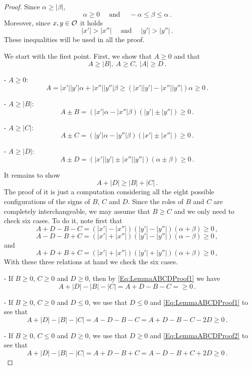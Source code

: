 \begin{proof}
Since $\alpha \geq |\beta |$,
$$
\alpha\geq 0 \quad \textrm{ and } \quad  -\alpha \leq \beta \leq \alpha\,.
$$
Moreover, since $x,y\in\mathcal{O}$ it holds
$$
|x'|>|x''| \quad \textrm{ and } \quad |y'|>|y''|\,.
$$
These inequalities will be used in all the proof.

We start with the first point. First,  we show that $A\geq 0$ and that
$$
A \geq |B|, \ A \geq C ,\ |A| \geq D\,.
$$


- $A \geq 0$:
$$
 A =  |x'||y'|  \alpha + |x''||y''|\beta \geq (|x'||y'|  - |x''||y''|)\alpha \geq 0\,.
$$

- $A \geq |B|$:
$$
A\pm B = (|x'|\alpha-|x''|\beta)(|y'|\pm |y''|) \geq 0\,.
$$

- $A \geq |C|$:
$$
A\pm C = (|y'|\alpha-|y''|\beta)(|x'|\pm |x''|)  \geq 0\,.
$$

- $A \geq |D|$:
$$
A\pm D = (|x'||y'| \pm |x''||y''|)(\alpha \pm \beta) \geq 0\,.
$$


It remains to show
$$
A + |D| \geq |B| + |C|\,.
$$
The proof of it is just a computation considering all the eight possible configurations of the signs of $B$, $C$ and $D$. Since the roles of $B$ and $C$ are completely interchangeable, we may assume that $B \geq C$ and we only need to check six cases. To do it, note first that
\begin{equation}
\label{Eq:LemmaABCDProof1}
A + D - B - C = (|x'|-|x''|)(|y'|-|y''|)(\alpha + \beta) \geq 0 \,,
\end{equation}
\begin{equation}
\label{Eq:LemmaABCDProof2}
A - D - B + C = (|x'|+|x''|)(|y'|-|y''|)(\alpha - \beta) \geq 0 \,,
\end{equation}
and
\begin{equation}
\label{Eq:LemmaABCDProof3}
A + D + B + C = (|x'|+|x''|)(|y'|+|y''|)(\alpha + \beta) \geq 0 \,,
\end{equation}
With these three relations at hand we check the six cases.

- If $B \geq 0$, $C \geq 0$ and $D \geq 0$, then by \eqref{Eq:LemmaABCDProof1} we have
$$
A + |D| - |B| - |C| = A + D - B - C = \geq 0\,.
$$

- If $B \geq 0$, $C \geq 0$ and $D \leq 0$, we use that $D\leq 0$ and \eqref{Eq:LemmaABCDProof1} to see that
$$
A + |D| - |B| - |C| = A - D - B - C =  A + D - B - C -2D \geq 0\,.
$$

- If $B \geq 0$, $C \leq 0$ and $D \geq 0$, we use that $D\geq 0$ and \eqref{Eq:LemmaABCDProof2} to see that
$$
A + |D| - |B| - |C| = A + D - B + C =  A - D - B + C +2D \geq 0\,.
$$


\end{proof}
